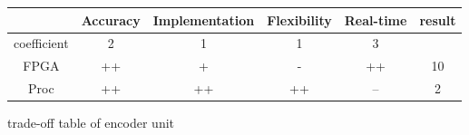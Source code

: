 \begin{figure}[!ht]
\begin{tabular}{|c|c|c|c|c|c|}\hline
                         & Accuracy  & Implementation & Flexibility & Real-time & result \\\hline
coefficient   &         2          &           1                      &         1           &           3         &              \\\hline
FPGA            &      ++          &            +                    &         -           &        ++         & 10        \\\hline
Proc               &      ++         &              ++                &         ++       &         --          & 2          \\\hline
\end{tabular}
\caption{trade-off table of encoder unit}
\end{figure}


